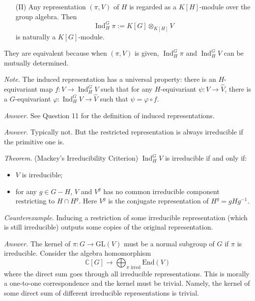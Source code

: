 \documentclass{mathproblems}
\newcommand\C{\mathbb{C}}
\newcommand\End{\mathrm{End}}
\newcommand\GL{\mathrm{GL}}
\DeclareMathOperator{\Ind}{Ind}
\begin{document}
\begin{questions}
\begin{itemize}
\item[(II)] Any representation $(\pi,V)$ of $H$ is regarded as a $K[H]$-module over the group algebra. Then
$$
\Ind_H^G \pi := K[G]\otimes_{K[H]} V
$$
is naturally a $K[G]$-module.
\end{itemize}
They are equivalent because when $(\pi,V)$ is given, $\Ind_H^G \pi$ and $\Ind_H^G V$ can be mutually determined.

\textit{Note.} The induced representation has a universal property: there is an $H$-equivariant map $f:V\to \Ind_H^G V$ such that for any $H$-equivariant $\psi:V\to \hat{V}$, there is a $G$-equivariant $\varphi:\Ind_H^G V\to \hat{V}$ such that $\psi=\varphi\circ f$.


\textit{Answer.} See Question 11 for the definition of induced representations.


\textit{Answer.} Typically not. But the restricted representation is always irreducible if the primitive one is.

{\color{violet}
\textit{Theorem.} (Mackey's Irreducibility Criterion) $\Ind_H^G V$ is irreducible if and only if:
\begin{itemize}
    \item $V$ is irreducible;
    \item for any $g\in G-H$, $V$ and $V^g$ has no common irreducible component restricting to $H\cap H^g$. Here $V^g$ is the conjugate representation of $H^g=g H g^{-1}$.
\end{itemize}
}

\textit{Counterexample.} Inducing a restriction of some irreducible representation (which is still irreducible) outputs some copies of the original representation.


\textit{Answer.} The kernel of $\pi:G\to \GL(V)$ must be a normal subgroup of $G$ if $\pi$ is irreducible. Consider the algebra homomorphism
$$
\C[G]\longrightarrow \bigoplus_{\pi \text{ irred}} \End(V)
$$
where the direct sum goes through all irreducible representations. This is morally a one-to-one correspondence and the kernel must be trivial. Namely, the kernel of some direct sum of different irreducible representations is trivial.


\end{questions}
\end{document}
